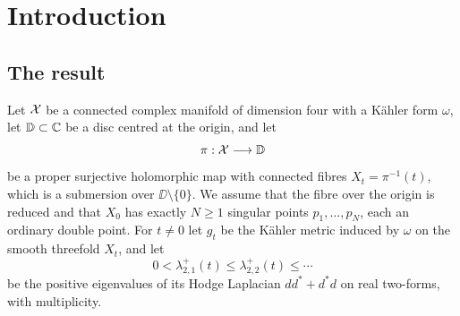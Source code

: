 \section{Introduction}\label{sec:intro}

\subsection{The result}
Let $\mathcal X$ be a connected complex manifold of dimension four with a
K\"ahler form $\omega$, let $\mathbb D\subset\mathbb C$ be a disc centred at the
origin, and let
\[
 \pi:\mathcal X\longrightarrow\mathbb D
\]
be a proper surjective holomorphic map with connected fibres
$X_t=\pi^{-1}(t)$, which is a submersion over $\DD\setminus\{0\}$. We
assume that the fibre over the origin is reduced and that $X_0$ has
exactly $N\ge1$ singular points
$p_1,\ldots,p_N$, each an ordinary double point. For $t\ne0$ let $g_t$ be
the K\"ahler metric induced by $\omega$ on the smooth threefold $X_t$,
and let
\[
 0<\lambda^+_{2,1}(t)\le\lambda^+_{2,2}(t)\le\cdots
\]
be the positive eigenvalues of its Hodge Laplacian $dd^*+d^*d$ on real
two-forms, with multiplicity.


